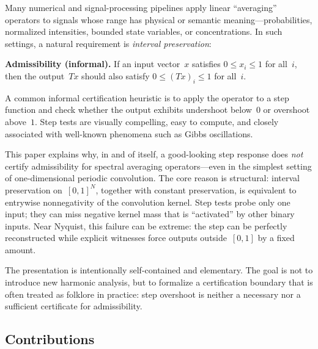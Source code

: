 \documentclass[11pt,a4paper]{article}
\theoremstyle{plain}
\theoremstyle{definition}
\theoremstyle{plain}
\begin{document}
Many numerical and signal-processing pipelines apply linear ``averaging''
operators to signals whose range has physical or semantic meaning---probabilities,
normalized intensities, bounded state variables, or concentrations.  In such
settings, a natural requirement is \emph{interval preservation}:

\medskip
\noindent\textbf{Admissibility (informal).}
If an input vector~$x$ satisfies $0 \le x_i \le 1$ for all~$i$, then the
output~$Tx$ should also satisfy $0 \le (Tx)_i \le 1$ for all~$i$.
\medskip

A common informal certification heuristic is to apply the operator to a step
function and check whether the output exhibits undershoot below~$0$ or overshoot
above~$1$.  Step tests are visually compelling, easy to compute, and closely
associated with well-known phenomena such as Gibbs oscillations.

This paper explains why, in and of itself, a good-looking step response does
\emph{not} certify admissibility for spectral averaging operators---even in the
simplest setting of one-dimensional periodic convolution.  The core reason is
structural: interval preservation on~$[0,1]^N$, together with constant
preservation, is equivalent to entrywise nonnegativity of the convolution kernel.
Step tests probe only one input; they can miss negative kernel mass that is
``activated'' by other binary inputs.  Near Nyquist, this failure can be extreme:
the step can be perfectly reconstructed while explicit witnesses force outputs
outside~$[0,1]$ by a fixed amount.

The presentation is intentionally self-contained and elementary.  The goal is not
to introduce new harmonic analysis, but to formalize a certification boundary
that is often treated as folklore in practice: step overshoot is neither a
necessary nor a sufficient certificate for admissibility.


\subsection{Contributions}
\label{sec:contributions}
\end{document}
